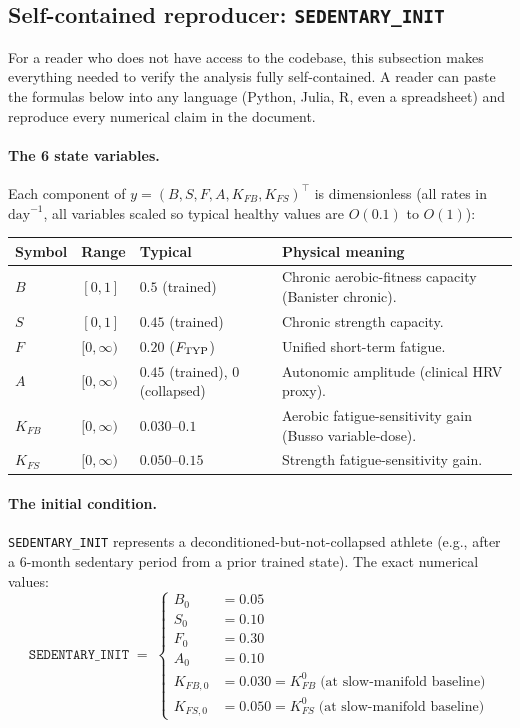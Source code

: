 \documentclass[11pt,a4paper]{article}
\theoremstyle{definition}
\begin{document}
\subsection{Self-contained reproducer: \texttt{SEDENTARY\_INIT}} \label{sec:reproducer}

For a reader who does not have access to the codebase, this subsection makes everything needed to verify the analysis fully self-contained. A reader can paste the formulas below into any language (Python, Julia, R, even a spreadsheet) and reproduce every numerical claim in the document.

\paragraph{The 6 state variables.} Each component of $y = (B, S, F, A, K_{FB}, K_{FS})^\top$ is dimensionless (all rates in $\text{day}^{-1}$, all variables scaled so typical healthy values are $O(0.1)$ to $O(1)$):

\begin{center}\small
\begin{tabular}{lllp{6.3cm}}
\toprule
Symbol & Range & Typical & Physical meaning \\
\midrule
$B$       & $[0, 1]$       & $0.5$ (trained)  & Chronic aerobic-fitness capacity (Banister chronic). \\
$S$       & $[0, 1]$       & $0.45$ (trained) & Chronic strength capacity. \\
$F$       & $[0, \infty)$  & $0.20$ ($F_{\rm TYP}$) & Unified short-term fatigue. \\
$A$       & $[0, \infty)$  & $0.45$ (trained), $0$ (collapsed) & Autonomic amplitude (clinical HRV proxy). \\
$K_{FB}$  & $[0, \infty)$  & $0.030$--$0.1$   & Aerobic fatigue-sensitivity gain (Busso variable-dose). \\
$K_{FS}$  & $[0, \infty)$  & $0.050$--$0.15$  & Strength fatigue-sensitivity gain. \\
\bottomrule
\end{tabular}
\end{center}

\paragraph{The initial condition.} \texttt{SEDENTARY\_INIT} represents a deconditioned-but-not-collapsed athlete (e.g., after a 6-month sedentary period from a prior trained state). The exact numerical values:
\begin{equation}
\boxed{\;
\texttt{SEDENTARY\_INIT} \;=\;
\begin{cases}
B_0       &= 0.05 \\
S_0       &= 0.10 \\
F_0       &= 0.30 \\
A_0       &= 0.10 \\
K_{FB,0}  &= 0.030 = K_{FB}^0\;\text{(at slow-manifold baseline)} \\
K_{FS,0}  &= 0.050 = K_{FS}^0\;\text{(at slow-manifold baseline)}
\end{cases}
\;}
\label{eq:sedentary-init}
\end{equation}
\end{document}
